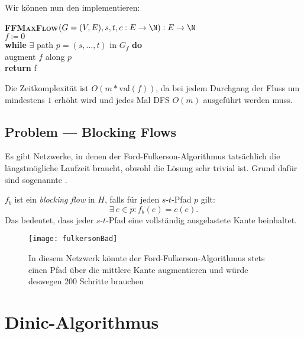 Wir können nun den  implementieren:

\begin{pseudocode}
  \textbf{\textsc{FFMaxFlow}}\( (G = (V,E), s, t, c: E \to \N) : E \to \N \) \\
  \phantom{\enskip} \( f \coloneqq 0 \) \\
  \phantom{\enskip} \textbf{while} \( \exists \) path \( p = (s,\dots,t) \) in \( G_f \) \textbf{do} \\
  \phantom{\enskip} \phantom{\enskip} augment \( f \) along \( p \) \\
  \phantom{\enskip} \textbf{return} f
\end{pseudocode}

Die Zeitkomplexität ist \( O(m*\text{val}(f)) \), da bei jedem Durchgang der Fluss um mindestens \( 1 \) erhöht wird und jedes Mal DFS \( O(m) \) ausgeführt werden muss.

\subsection{Problem --- Blocking Flows}

\begin{minipage}{.6\textwidth}
  Es gibt Netzwerke, in denen der Ford-Fulkerson-Algorithmus tatsächlich die längstmögliche Laufzeit braucht, obwohl die Lösung sehr trivial ist. Grund dafür sind sogenannte .

  \( f_b \) ist ein \emph{blocking flow} in \( H \), falls für jeden \( s \)-\( t \)-Pfad \( p \) gilt:
  \begin{equation*}
    \exists \ e \in p : f_b(e) = c(e)\text{.}
  \end{equation*}
  Das bedeutet, dass jeder \( s \)-\( t \)-Pfad eine vollständig ausgelastete Kante beinhaltet.
\end{minipage}
\hfill
\begin{minipage}{.35\textwidth}
  \begin{figure}[H]
    \texttt{[image: fulkersonBad]}
    \caption{In diesem Netzwerk könnte der Ford-Fulkerson-Algorithmus stets einen Pfad über die mittlere Kante augmentieren und würde deswegen 200 Schritte brauchen}
  \end{figure}
\end{minipage}

\section{Dinic-Algorithmus}

